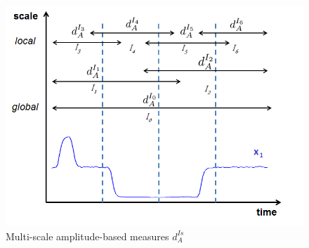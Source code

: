 \begin{figure}[h!]
\centering
\includegraphics[width=0.8\linewidth]{images/Intervalles2}
\caption{Multi-scale amplitude-based measures $d^{Is}_A$}
\label{fig:Intervalles}
\end{figure}



